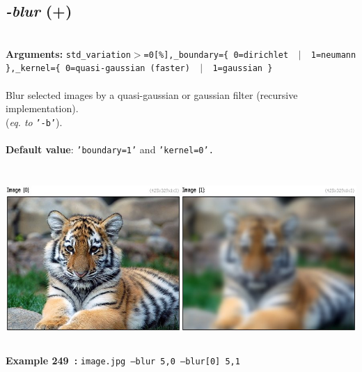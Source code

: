 \documentclass[a4paper,11pt,twoside]{book}
\begin{document}
\subsection{\emph{-blur} (+)}\vspace*{-0.5em}
~\\\textbf{Arguments: } 
{\small \texttt{std\_variation$>$=0[\%],\_boundary=\{ 0=dirichlet ~$|$~ 1=neumann \},\_kernel=\{ 0=quasi-gaussian (faster) ~$|$~ 1=gaussian \}}}\\~\\
Blur selected images by a quasi-gaussian or gaussian filter (recursive implementation).
~\\(\emph{eq. to} {\small \texttt{'-b'}}).
~\\~\\\textbf{Default value}: {\small \texttt{'boundary=1'} and \texttt{'kernel=0'.}}
\begin{center}\includegraphics[keepaspectratio=true,height=7cm,width=\textwidth]{img/gmic_def249.jpg}\\
{\footnotesize \textbf{Example 249~:} \texttt{image.jpg --blur 5,0 --blur[0] 5,1}}
\end{center}
\end{document}

